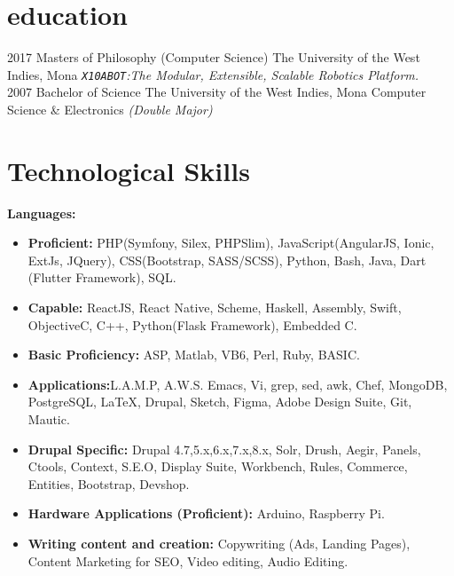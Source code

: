\documentclass[]{friggeri-cv} %
\begin{document}
\section{education}

\begin{entrylist}
\entry
{2017}
{Masters {\normalfont of Philosophy (Computer Science)}}
{The University of the West Indies, Mona}
{\emph{\texttt{X10ABOT}:The Modular, Extensible, Scalable Robotics Platform.}} \\
\entry
{2007}
{Bachelor {\normalfont of Science}}
{The University of the West Indies, Mona}
{Computer Science \& Electronics \emph{(Double Major)}}
\end{entrylist}


\section{Technological Skills}
\textbf{Languages:}
\begin{itemize}
\item \textbf{Proficient: }PHP(Symfony, Silex, PHPSlim), JavaScript(AngularJS, Ionic, ExtJs, JQuery), CSS(Bootstrap, SASS/SCSS), Python, Bash, Java, Dart (Flutter Framework), SQL.
\item \textbf{Capable: }ReactJS, React Native, Scheme, Haskell, Assembly, Swift, Objective\-C, C++, Python(Flask Framework), Embedded C.
\item \textbf{Basic Proficiency: }ASP, Matlab, VB6, Perl, Ruby, BASIC.
\item \textbf{Applications:}L.A.M.P, A.W.S. Emacs, Vi, grep, sed, awk, Chef, MongoDB, PostgreSQL, \LaTeX, Drupal, Sketch, Figma, Adobe Design Suite, Git, Mautic.
\item \textbf{Drupal Specific: } Drupal 4.7,5.x,6.x,7.x,8.x, Solr, Drush, Aegir, Panels, Ctools, Context, S.E.O, Display Suite, Workbench, Rules, Commerce, Entities, Bootstrap, Devshop.
\item \textbf{Hardware Applications (Proficient):} Arduino, Raspberry Pi.
\item \textbf{Writing content and creation:} Copywriting (Ads, Landing Pages), Content Marketing for SEO, Video editing, Audio Editing.
\end{itemize}
\end{document}
